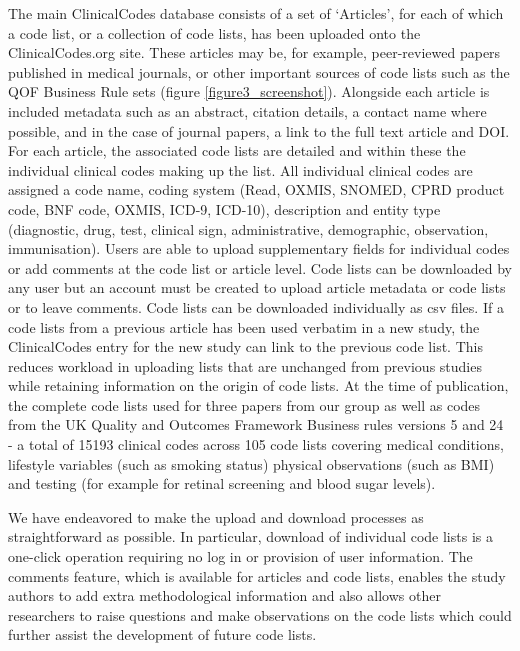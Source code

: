 \documentclass[10pt]{article}
\begin{document}
The main ClinicalCodes database consists of a set of `Articles', for each of which a code list, or a collection of code lists, has been uploaded onto the ClinicalCodes.org site. These articles may be, for example, peer-reviewed papers published in medical journals, or other important sources of code lists such as the QOF Business Rule sets (figure \ref{figure3_screenshot}). Alongside each article is included  metadata such as an abstract, citation details, a contact name where possible, and in the case of journal papers, a link to the full text article and DOI. For each article, the associated code lists are detailed and within these the individual clinical codes making up the list.  All individual clinical codes are assigned a code name, coding system (Read, OXMIS, SNOMED, CPRD product code, BNF code, OXMIS, ICD-9, ICD-10), description and entity type (diagnostic, drug, test, clinical sign, administrative, demographic, observation, immunisation).  Users are able to upload supplementary fields for individual codes or add comments at the code list or article level.  Code lists can be downloaded by any user but an account must be created to upload article metadata or code lists or to leave comments. Code lists can be downloaded individually as csv files. If a code lists from a previous article has been used verbatim in a new study, the ClinicalCodes entry for the new study can link to the previous code list.  This reduces workload in uploading lists that are unchanged from previous studies while retaining information on the origin of code lists.  At the time of publication, the complete code lists used for three papers from our group \cite{Doran2011, Kontopantelis2014, Reeves2014} as well as codes from the UK Quality and Outcomes Framework Business rules versions 5 and 24 - a total of 15193 clinical codes across 105 code lists covering medical conditions, lifestyle variables (such as smoking status) physical observations (such as BMI) and testing (for example for retinal screening and blood sugar levels).

We have endeavored to make the upload and download processes as straightforward as possible. In particular, download of individual code lists is a one-click operation requiring no log in or provision of user information.  The comments feature, which is available for articles and code lists, enables the study authors to add extra methodological information and also allows other researchers to raise questions and make observations on the code lists which could further assist the development of future code lists.
\end{document}
